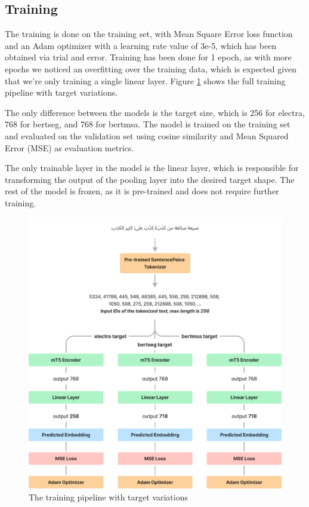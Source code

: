 \documentclass[12.5pt]{article}
\begin{document}
\subsection{Training}

The training is done on the training set, with Mean Square Error loss function and an Adam optimizer with a learning rate value of 3e-5, which has been obtained via trial and error. Training has been done for 1 epoch, as with more epochs we noticed an overfitting over the training data, which is expected given that we’re only training a single linear layer. Figure \ref{fig:training} shows the full training pipeline with target variations.

The only difference between the models is the target size, which is 256 for electra, 768 for bertseg, and 768 for bertmsa. The model is trained on the training set and evaluated on the validation set using cosine similarity and Mean Squared Error (MSE) as evaluation metrics.

The only trainable layer in the model is the linear layer, which is responsible for transforming the output of the pooling layer into the desired target shape. The rest of the model is frozen, as it is pre-trained and does not require further training.

\begin{figure}
    \centering
    \captionsetup{justification=centering}
    \includegraphics[width=\textwidth]{training.png}
    \caption{The training pipeline with target variations}
    \label{fig:training}
\end{figure}
\end{document}
